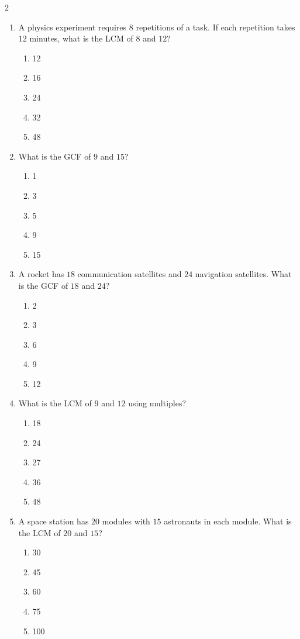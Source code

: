 \documentclass[10pt]{article}
\begin{document}
\begin{multicols}{2}
\begin{enumerate}[label=\textbf{Q\arabic*.}, leftmargin=*, itemsep=6pt, parsep=0pt]
  \item \small A physics experiment requires $8$ repetitions of a task. If each repetition takes $12$ minutes, what is the LCM of $8$ and $12$?
  \begin{enumerate}[label=(\Alph*), leftmargin=0.6cm, nosep, itemsep=2pt]
    \item 12
    \item 16
    \item 24
    \item 32
    \item 48
  \end{enumerate}

  \item \small What is the GCF of $9$ and $15$?
  \begin{enumerate}[label=(\Alph*), leftmargin=0.6cm, nosep, itemsep=2pt]
    \item 1
    \item 3
    \item 5
    \item 9
    \item 15
  \end{enumerate}

  \item \small A rocket has $18$ communication satellites and $24$ navigation satellites. What is the GCF of $18$ and $24$?
  \begin{enumerate}[label=(\Alph*), leftmargin=0.6cm, nosep, itemsep=2pt]
    \item 2
    \item 3
    \item 6
    \item 9
    \item 12
  \end{enumerate}

  \item \small What is the LCM of $9$ and $12$ using multiples?
  \begin{enumerate}[label=(\Alph*), leftmargin=0.6cm, nosep, itemsep=2pt]
    \item 18
    \item 24
    \item 27
    \item 36
    \item 48
  \end{enumerate}

  \item \small A space station has $20$ modules with $15$ astronauts in each module. What is the LCM of $20$ and $15$?
  \begin{enumerate}[label=(\Alph*), leftmargin=0.6cm, nosep, itemsep=2pt]
    \item 30
    \item 45
    \item 60
    \item 75
    \item 100
  \end{enumerate}

\end{enumerate}
\end{multicols}
\end{document}
